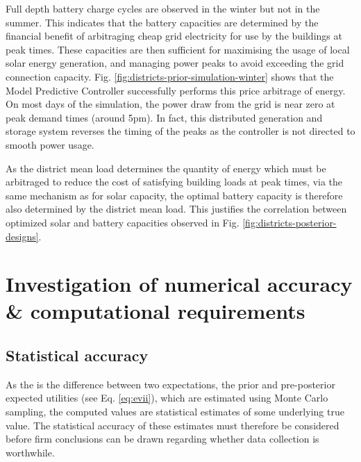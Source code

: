 \begin{subappendices}
    Full depth battery charge cycles are observed in the winter but not in the summer. This indicates that the battery capacities are determined by the financial benefit of arbitraging cheap grid electricity for use by the buildings at peak times. These capacities are then sufficient for maximising the usage of local solar energy generation, and managing power peaks to avoid exceeding the grid connection capacity. Fig. \ref{fig:districts-prior-simulation-winter} shows that the Model Predictive Controller successfully performs this price arbitrage of energy. On most days of the simulation, the power draw from the grid is near zero at peak demand times (around 5pm). In fact, this distributed generation and storage system reverses the timing of the peaks as the controller is not directed to smooth power usage.

    As the district mean load determines the quantity of energy which must be arbitraged to reduce the cost of satisfying building loads at peak times, via the same mechanism as for solar capacity, the optimal battery capacity is therefore also determined by the district mean load. This justifies the correlation between optimized solar and battery capacities observed in Fig. \ref{fig:districts-posterior-designs}.

    \newpage


    \section{Investigation of numerical accuracy \& computational requirements} \label{app:districts-numerics}

    \subsection{Statistical accuracy}

    As the  is the difference between two expectations, the prior and pre-posterior expected utilities (see Eq. \ref{eq:evii}), which are estimated using Monte Carlo sampling, the computed  values are statistical estimates of some underlying true value. The statistical accuracy of these estimates must therefore be considered before firm conclusions can be drawn regarding whether data collection is worthwhile.


\end{subappendices}
